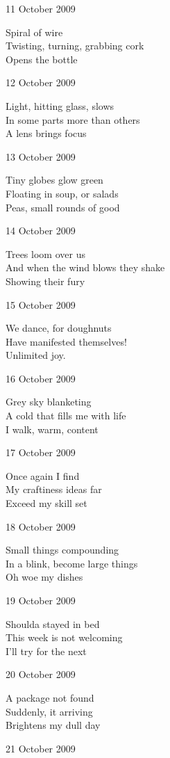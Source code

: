 \documentclass[12pt]{article}
\begin{document}
11 October 2009

Spiral of wire \\
Twisting, turning, grabbing cork \\
Opens the bottle

12 October 2009

Light, hitting glass, slows \\
In some parts more than others \\
A lens brings focus

13 October 2009

Tiny globes glow green \\
Floating in soup, or salads \\
Peas, small rounds of good

14 October 2009

Trees loom over us \\
And when the wind blows they shake \\
Showing their fury

15 October 2009

We dance, for doughnuts \\
Have manifested themselves! \\
Unlimited joy.

16 October 2009

Grey sky blanketing \\
A cold that fills me with life \\
I walk, warm, content

17 October 2009

Once again I find \\
My craftiness ideas far \\
Exceed my skill set

\newpage

18 October 2009

Small things compounding \\
In a blink, become large things \\
Oh woe my dishes

19 October 2009

Shoulda stayed in bed \\
This week is not welcoming \\
I'll try for the next

20 October 2009

A package not found \\
Suddenly, it arriving \\
Brightens my dull day

21 October 2009
\end{document}
